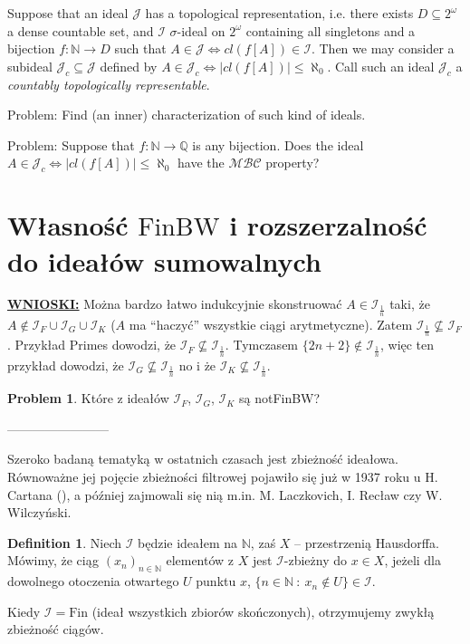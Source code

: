 \documentclass{amsart}
\theoremstyle{definition}
\newtheorem{problem}{Problem}
\newtheorem{df}{Definition}
\theoremstyle{definition}
\newcommand{\N}{{\mathbb N}}
\newcommand{\Q}{{\mathbb Q}}
\newcommand{\Fin}{\textrm{Fin}}
\newcommand{\I}{\mathcal I}
\newcommand{\J}{\mathcal J}
\newcommand{\finbw}{\text{FinBW}}
\begin{document}
Suppose that an ideal $\mathcal{J}$ has a topological representation, i.e.
there exists $D\subseteq 2^{\omega}$ a dense countable set, and $\I$ 
$\sigma$-ideal on $2^{\omega}$ containing all singletons 
and a bijection $f\colon \N\to D$ such that 
$A\in\J \iff \mathit{cl}(f[A])\in\mathcal{I}$. 
Then we may consider a subideal $\J_c \subseteq \J$ defined by
$A\in\J_c \iff |\mathit{cl}(f[A])| \leq \aleph_0$.
Call such an ideal $\J_c$ a \emph{countably topologically representable}.

Problem: Find (an inner) characterization of such kind of ideals.

Problem: Suppose that $f\colon \N\to \Q$ is any bijection.
Does the ideal $A\in\J_c \iff |\mathit{cl}(f[A])| \leq \aleph_0$
have the $\mathcal{MBC}$ property?

    \color{purple}
		
\section{Własność $\finbw$ i rozszerzalność do ideałów sumowalnych}

\textbf{\underline{WNIOSKI:}} 
Można bardzo łatwo indukcyjnie skonstruować $A\in \I_{\frac{1}{n}}$ taki, że $A\notin \I_F\cup\I_G\cup\I_K$ ($A$ ma "`haczyć"' wszystkie ciągi arytmetyczne). Zatem $\I_{\frac{1}{n}} \nsubseteq \I_F$. Przykład Primes dowodzi, że $\I_F \nsubseteq \I_{\frac{1}{n}}$. Tymczasem $\{2n+2\}\notin\I_{\frac{1}{n}}$, więc ten przykład dowodzi, że $\I_G \nsubseteq \I_{\frac{1}{n}}$ no i że $\I_K \nsubseteq \I_{\frac{1}{n}}$.

\begin{problem}
Które z ideałów $\I_F$, $\I_G$, $\I_K$ są notFinBW?
\end{problem}

------------------------
\color{teal}

Szeroko badaną tematyką w ostatnich czasach jest zbieżność ideałowa. Równoważne jej pojęcie zbieżności filtrowej pojawiło się już w 1937 roku u H. Cartana (\cite{cartan}), a później zajmowali się nią m.in. M. Laczkovich, I. Recław czy W. Wilczyński.  
\begin{df}
Niech $\I$ będzie ideałem na $\N$, zaś $X$ -- przestrzenią Hausdorffa. Mówimy, że ciąg $(x_n)_{n\in\N}$ elementów z $X$ jest $\I$-zbieżny do $x\in X$, jeżeli dla dowolnego otoczenia otwartego $U$ punktu $x$, $\{n\in \N\ :\ x_n\not\in U  \}\in\I$. %
\end{df}
Kiedy $\I=\Fin$ (ideał wszystkich zbiorów skończonych), otrzymujemy zwykłą zbieżność ciągów.
\end{document}
